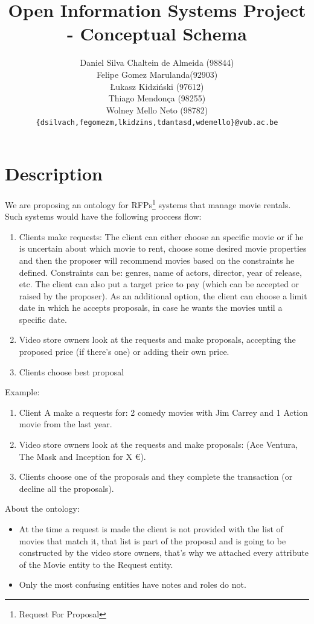 \documentclass[a4paper,10pt]{article}
\title{Open Information Systems Project - Conceptual Schema}
\author{Daniel Silva Chaltein de Almeida (98844)\\
Felipe Gomez Marulanda(92903)\\
Łukasz Kidziński (97612)\\
Thiago Mendonça (98255)\\
Wolney Mello Neto (98782)\\
\texttt{\{{}dsilvach,fegomezm,lkidzins,tdantasd,wdemello\}@vub.ac.be}}
\begin{document}
\maketitle

\section{Description}

We are proposing an ontology for RFPs\footnote{Request For Proposal} systems that manage movie rentals. Such systems would have the following proccess flow:
\begin{enumerate}
  \item Clients make requests: The client can either choose an specific movie or if he is uncertain about which movie to rent, choose some desired movie properties and then the proposer will recommend movies based on the constraints he defined.
    \subitem Constraints can be: genres, name of actors, director, year of release, etc.
    \subitem The client can also put a target price to pay (which can be accepted or raised by the proposer).
    \subitem As an additional option, the client can choose a limit date in which he accepts proposals, in case he wants the movies until a specific date.
  \item Video store owners look at the requests and make proposals, accepting the proposed price (if there's one) or adding their own price.
  \item Clients choose best proposal
\end{enumerate}

Example:
\begin{enumerate}
  \item Client A make a requests for: 2 comedy movies with Jim Carrey and 1 Action movie from the last year.
  \item Video store owners look at the requests and make proposals: (Ace Ventura, The Mask and Inception for X \euro).
  \item Clients choose one of the proposals and they complete the transaction (or decline all the proposals).
\end{enumerate}

About the ontology:
\begin{itemize}
  \item At the time a request is made the client is not provided with the list of movies that match it, that list is part of the proposal and is going to be constructed by the video store owners, that's why we attached every attribute of the Movie entity to the Request entity.
  \item Only the most confusing entities have notes and roles do not.
\end{itemize}
\end{document}
